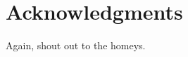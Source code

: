 \documentclass[10pt,letterpaper]{article}
\begin{document}
%
%

\section*{Acknowledgments}
Again, shout out to the homeys.
\nolinenumbers

%
%
% 

\end{document}
